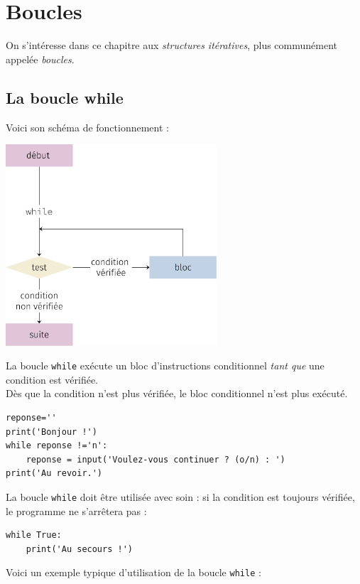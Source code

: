 \chapter{Boucles}
On s'intéresse dans ce chapitre aux \textit{structures itératives}, plus communément appelée \textit{boucles}.\\


\section{La boucle while}

Voici son schéma de fonctionnement :
\begin{center}
    \includegraphics[height=7.5cm]{ch-boucles/img/while.png}
\end{center}

La boucle \texttt{while} exécute un bloc d'instructions conditionnel \textit{tant que} une condition est vérifiée.\\
Dès que la condition n'est plus vérifiée, le bloc conditionnel n'est plus exécuté.

\begin{pys}
\begin{verbatim}
reponse=''
print('Bonjour !')
while reponse !='n':
    reponse = input('Voulez-vous continuer ? (o/n) : ')
print('Au revoir.')
\end{verbatim}
\end{pys}
La boucle \texttt{while} doit être utilisée avec soin : si la condition est toujours vérifiée, le programme ne s'arrêtera pas :

\begin{pyc}
\begin{verbatim}
while True:
    print('Au secours !')
\end{verbatim}
\end{pyc}
Voici un exemple typique d'utilisation de la boucle \texttt{while} : \\

